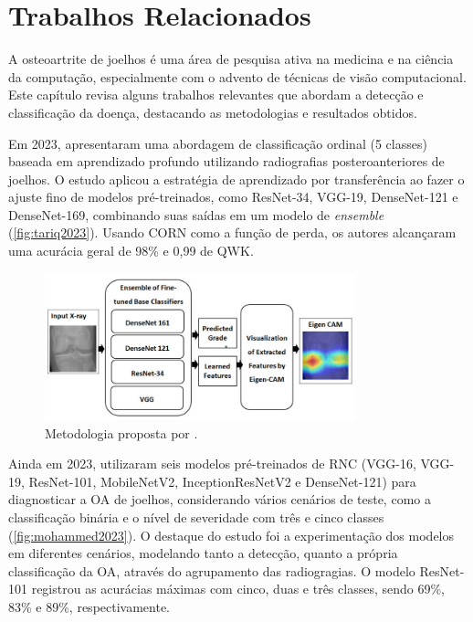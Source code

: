 \chapter{Trabalhos Relacionados}\label{cap:trab_relacionados}

A osteoartrite de joelhos é uma área de pesquisa ativa na medicina e na ciência da computação, especialmente com o advento de técnicas de visão computacional. Este capítulo revisa alguns trabalhos relevantes que abordam a detecção e classificação da doença, destacando as metodologias e resultados obtidos.

Em 2023, \cite{Tariq2023} apresentaram uma abordagem de classificação ordinal (5 classes) baseada em aprendizado profundo utilizando radiografias posteroanteriores de joelhos. O estudo aplicou a estratégia de aprendizado por transferência ao fazer o ajuste fino de modelos pré-treinados, como ResNet-34, VGG-19, DenseNet-121 e DenseNet-169, combinando suas saídas em um modelo de \textit{ensemble} (\autoref{fig:tariq2023}). Usando CORN como a função de perda, os autores alcançaram uma acurácia geral de 98\% e 0,99 de QWK.

\begin{figure}[ht]
    \centering
    \includegraphics[width=0.8\textwidth]{figs/tariq2023.png}
    \caption{Metodologia proposta por \cite{Tariq2023}.}
    \label{fig:tariq2023}
\end{figure}

Ainda em 2023, \cite{Mohammed2023} utilizaram seis modelos pré-treinados de RNC (VGG-16, VGG-19, ResNet-101, MobileNetV2, InceptionResNetV2 e DenseNet-121) para diagnosticar a OA de joelhos, considerando vários cenários de teste, como a classificação binária e o nível de severidade com três e cinco classes (\autoref{fig:mohammed2023}). O destaque do estudo foi a experimentação dos modelos em diferentes cenários, modelando tanto a detecção, quanto a própria classificação da OA, através do agrupamento das radiogragias. O modelo ResNet-101 registrou as acurácias máximas com cinco, duas e três classes, sendo 69\%, 83\% e 89\%, respectivamente.

